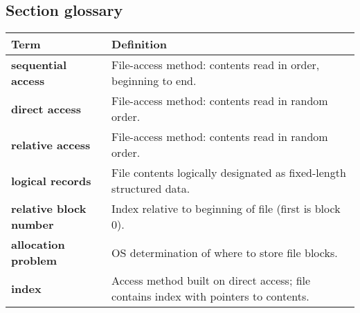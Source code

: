 \subsection*{Section glossary}
\begin{tabular}{p{}p{}}
    \toprule
    \textbf{Term} & \textbf{Definition} \\
    \midrule
    \textbf{sequential access} & File-access method: contents read in order, beginning to end. \\
    \textbf{direct access} & File-access method: contents read in random order. \\
    \textbf{relative access} & File-access method: contents read in random order. \\
    \textbf{logical records} & File contents logically designated as fixed-length structured data. \\
    \textbf{relative block number} & Index relative to beginning of file (first is block 0). \\
    \textbf{allocation problem} & OS determination of where to store file blocks. \\
    \textbf{index} & Access method built on direct access; file contains index with pointers to contents. \\
    \bottomrule
\end{tabular}

